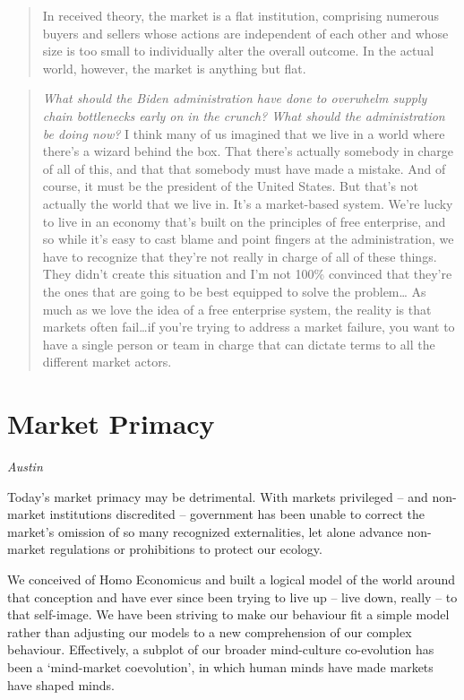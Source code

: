 \documentclass[
]{book}
\begin{document}
\begin{quote}
In received theory, the market is a flat institution, comprising
numerous buyers and sellers whose actions are independent of each other and whose size is
too small to individually alter the overall outcome.
In the actual world, however, the market is anything but flat.
\end{quote}

\begin{quote}
\emph{What should the Biden administration have done to overwhelm supply chain bottlenecks early on in the crunch? What should the administration be doing now?}
I think many of us imagined that we live in a world where there's a wizard behind the box. That there's actually somebody in charge of all of this, and that that somebody must have made a mistake. And of course, it must be the president of the United States. But that's not actually the world that we live in. It's a market-based system. We're lucky to live in an economy that's built on the principles of free enterprise, and so while it's easy to cast blame and point fingers at the administration, we have to recognize that they're not really in charge of all of these things. They didn't create this situation and I'm not 100\% convinced that they're the ones that are going to be best equipped to solve the problem\ldots{}
As much as we love the idea of a free enterprise system, the reality is that markets often fail\ldots if you're trying to address a market failure, you want to have a single person or team in charge that can dictate terms to all the different market actors.
\end{quote}

\hypertarget{market-primacy-1}{%
\section{Market Primacy}\label{market-primacy-1}}

\emph{Austin}

Today's market primacy may be detrimental. With markets privileged -- and non-market institutions discredited -- government has been unable to correct the market's omission of so many recognized externalities, let alone advance non-market regulations or prohibitions to protect our ecology.

We conceived of Homo Economicus and built a logical model of the world around that conception and have ever since been trying to live up -- live down, really -- to that self-image. We have been striving to make our behaviour fit a simple model rather than adjusting our models to a new comprehension of our complex behaviour. Effectively, a subplot of our broader mind-culture co-evolution has been a `mind-market coevolution', in which human minds have made markets have shaped minds.
\end{document}
